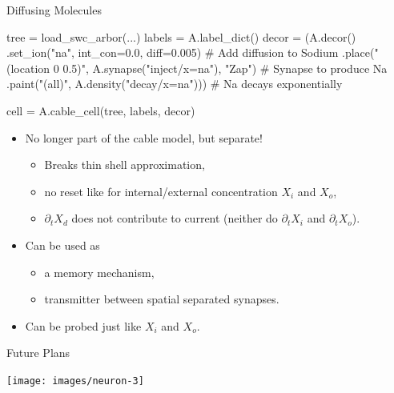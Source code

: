 \documentclass{beamer}
\begin{document}
\begin{frame}[fragile]{Diffusing Molecules}
  \begin{codePythonblock}
    tree = load_swc_arbor(...)
    labels = A.label_dict()
    decor = (A.decor()
          .set_ion("na", int_con=0.0, diff=0.005)                     # Add diffusion to Sodium
          .place("(location 0 0.5)", A.synapse("inject/x=na"), "Zap") # Synapse to produce Na
          .paint("(all)", A.density("decay/x=na")))                   # Na decays exponentially

    cell = A.cable_cell(tree, labels, decor)
  \end{codePythonblock}
  \begin{itemize}
    \item No longer part of the cable model, but separate!
    \begin{itemize}
      \item Breaks thin shell approximation,
      \item no reset like for internal/external concentration $ X_{i}$ and  $X_{o}$,
      \item $\partial_{t} X_{d}$ does not contribute to current (neither do $\partial_{t} X_{i}$ and $\partial_{t} X_{o}$).
    \end{itemize}
    \item Can be used as
    \begin{itemize}
      \item a memory mechanism,
      \item transmitter between spatial separated synapses.
    \end{itemize}
    \item Can be probed just like  $ X_{i}$ and  $X_{o}$.
  \end{itemize}
\end{frame}

\begin{frame}{Future Plans}
  \begin{center}
    \texttt{[image: images/neuron-3]}
  \end{center}
\end{frame}
\end{document}
